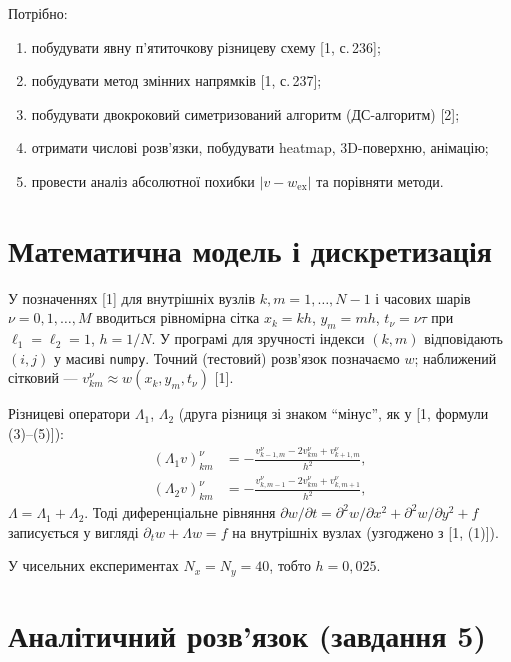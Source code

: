 \documentclass[12pt,a4paper]{article}
\newcommand{\Lao}{\Lambda_1}
\newcommand{\Lat}{\Lambda_2}
\newcommand{\La}{\Lambda}
\newcommand{\wex}{w_{\mathrm{ex}}}
\newcommand{\vnum}{v}
\begin{document}
Потрібно:
\begin{enumerate}
  \item побудувати явну п'ятиточкову різницеву схему [1, с.\,236];
  \item побудувати метод змінних напрямків  [1, с.\,237];
  \item побудувати двокроковий симетризований алгоритм (ДС-алгоритм) [2];
  \item отримати числові розв'язки, побудувати heatmap, 3D-поверхню, анімацію;
  \item провести аналіз абсолютної похибки $|\vnum-\wex|$ та порівняти методи.
\end{enumerate}

\section{Математична модель і дискретизація}

У позначеннях [1] для внутрішніх вузлів $k,m=1,\dots,N-1$ і часових шарів $\nu=0,1,\dots,M$ вводиться рівномірна сітка
$x_k=k h$, $y_m=m h$, $t_\nu=\nu\tau$ при $\ell_1=\ell_2=1$, $h=1/N$. У програмі для зручності індекси $(k,m)$ відповідають $(i,j)$ у масиві \texttt{numpy}. Точний (тестовий) розв'язок позначаємо $w$; наближений сітковий --- $v_{km}^\nu\approx w(x_k,y_m,t_\nu)$ [1].

Різницеві оператори $\Lao$, $\Lat$ (друга різниця зі знаком ``мінус'', як у [1, формули (3)--(5)]):
\begin{align}
  (\Lao v)_{km}^\nu &= -\frac{v_{k-1,m}^\nu - 2v_{km}^\nu + v_{k+1,m}^\nu}{h^2},\\
  (\Lat v)_{km}^\nu &= -\frac{v_{k,m-1}^\nu - 2v_{km}^\nu + v_{k,m+1}^\nu}{h^2},
\end{align}
$\La=\Lao+\Lat$. Тоді диференціальне рівняння $\partial w/\partial t=\partial^2 w/\partial x^2+\partial^2 w/\partial y^2+f$
записується у вигляді $\partial_t w + \La w = f$ на внутрішніх вузлах (узгоджено з [1, (1)]).

У чисельних експериментах $N_x=N_y=40$, тобто $h=0{,}025$.

\section{Аналітичний розв'язок (завдання 5)}
\end{document}
